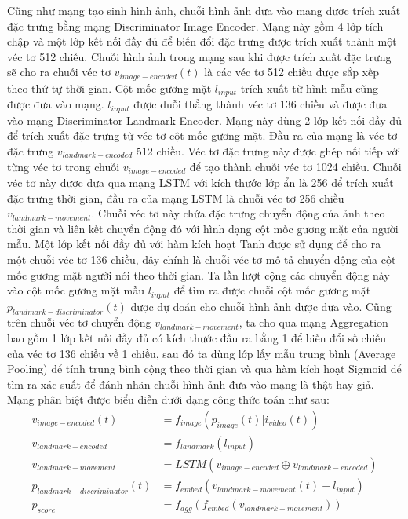 Cũng như mạng tạo sinh hình ảnh, chuỗi hình ảnh đưa vào mạng được trích xuất đặc trưng bằng mạng Discriminator Image Encoder. Mạng này gồm 4 lớp tích chập và một lớp kết nối đầy đủ để biến đổi đặc trưng được trích xuất thành một véc tơ 512 chiều. Chuỗi hình ảnh trong mạng sau khi được trích xuất đặc trưng sẽ cho ra chuỗi véc tơ $v_{image-encoded}(t)$ là các véc tơ 512 chiều được sắp xếp theo thứ tự thời gian. Cột mốc gương mặt $l_{input}$ trích xuất từ hình mẫu cũng được đưa vào mạng. $l_{input}$ được duỗi thẳng thành véc tơ 136 chiều và được đưa vào mạng Discriminator Landmark Encoder. Mạng này dùng 2 lớp kết nối đầy đủ để trích xuất đặc trưng từ véc tơ cột mốc gương mặt. Đầu ra của mạng là véc tơ đặc trưng $v_{landmark-encoded}$ 512 chiều. Véc tơ đặc trưng này được ghép nối tiếp với từng véc tơ trong chuỗi $v_{image-encoded}$ để tạo thành chuỗi véc tơ 1024 chiều. Chuỗi véc tơ này được đưa qua mạng LSTM với kích thước lớp ẩn là 256 để trích xuất đặc trưng thời gian, đầu ra của mạng LSTM là chuỗi véc tơ 256 chiều $v_{landmark-movement}$. Chuỗi véc tơ này chứa đặc trưng chuyển động của ảnh theo thời gian và liên kết chuyển động đó với hình dạng cột mốc gương mặt của người mẫu. Một lớp kết nối đầy đủ với hàm kích hoạt Tanh được sử dụng để cho ra một chuỗi véc tơ 136 chiều, đây chính là chuỗi véc tơ mô tả chuyển động của cột mốc gương mặt người nói theo thời gian. Ta lần lượt cộng các chuyển động này vào cột mốc gương mặt mẫu $l_{input}$ để tìm ra được chuỗi cột mốc gương mặt $p_{landmark-discriminator}(t)$ được dự đoán cho chuỗi hình ảnh được đưa vào. Cũng trên chuỗi véc tơ chuyển động $v_{landmark-movement}$, ta cho qua mạng Aggregation bao gồm 1 lớp kết nối đầy đủ có kích thước đầu ra bằng 1 để biến đổi số chiều của véc tơ 136 chiều về 1 chiều, sau đó ta dùng lớp lấy mẫu trung bình (Average Pooling) để tính trung bình cộng theo thời gian và qua hàm kích hoạt Sigmoid để tìm ra xác suất để đánh nhãn chuỗi hình ảnh đưa vào mạng là thật hay giả. Mạng phân biệt được biểu diễn dưới dạng công thức toán như sau:
\begin{equation}
    \begin{split}
    v_{image-encoded}(t) &= f_{image}(p_{image}(t)|i_{video}(t))\\
    v_{landmark-encoded} &= f_{landmark}(l_{input})\\
    v_{landmark-movement} &= LSTM(v_{image-encoded} \oplus v_{landmark-encoded})\\
    p_{landmark-discriminator}(t) &= f_{embed}(v_{landmark-movement}(t) + l_{input})\\
    p_{score} &= f_{agg}(f_{embed}(v_{landmark-movement}))
    \end{split}
\end{equation}


